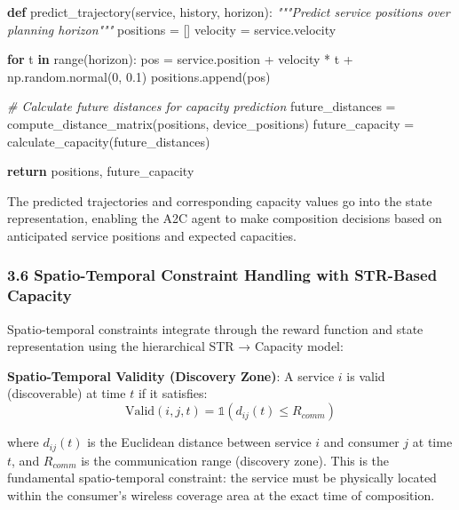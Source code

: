 \documentclass[
  10pt,
  twocolumn,
]{article}
\newenvironment{Shaded}{}{}
\newcommand{\BuiltInTok}[1]{\textcolor[rgb]{0.00,0.50,0.00}{#1}}
\newcommand{\CommentTok}[1]{\textcolor[rgb]{0.38,0.63,0.69}{\textit{#1}}}
\newcommand{\ControlFlowTok}[1]{\textcolor[rgb]{0.00,0.44,0.13}{\textbf{#1}}}
\newcommand{\DecValTok}[1]{\textcolor[rgb]{0.25,0.63,0.44}{#1}}
\newcommand{\FloatTok}[1]{\textcolor[rgb]{0.25,0.63,0.44}{#1}}
\newcommand{\KeywordTok}[1]{\textcolor[rgb]{0.00,0.44,0.13}{\textbf{#1}}}
\newcommand{\NormalTok}[1]{#1}
\newcommand{\OperatorTok}[1]{\textcolor[rgb]{0.40,0.40,0.40}{#1}}
\begin{document}
\begin{Shaded}
	\begin{Highlighting}[]
		\KeywordTok{def}\NormalTok{ predict\_trajectory(service, history, horizon):}
		\CommentTok{"""Predict service positions over planning horizon"""}
		\NormalTok{    positions }\OperatorTok{=}\NormalTok{ []}
		\NormalTok{    velocity }\OperatorTok{=}\NormalTok{ service.velocity}

		\ControlFlowTok{for}\NormalTok{ t }\KeywordTok{in} \BuiltInTok{range}\NormalTok{(horizon):}
		\NormalTok{        pos }\OperatorTok{=}\NormalTok{ service.position }\OperatorTok{+}\NormalTok{ velocity }\OperatorTok{*}\NormalTok{ t }\OperatorTok{+}\NormalTok{ np.random.normal(}\DecValTok{0}\NormalTok{, }\FloatTok{0.1}\NormalTok{)}
		\NormalTok{        positions.append(pos)}

		\CommentTok{\# Calculate future distances for capacity prediction}
		\NormalTok{    future\_distances }\OperatorTok{=}\NormalTok{ compute\_distance\_matrix(positions, device\_positions)}
		\NormalTok{    future\_capacity }\OperatorTok{=}\NormalTok{ calculate\_capacity(future\_distances)}

		\ControlFlowTok{return}\NormalTok{ positions, future\_capacity}
	\end{Highlighting}
\end{Shaded}

The predicted trajectories and corresponding capacity values go into the
state representation, enabling the A2C agent to make composition
decisions based on anticipated service positions and expected
capacities.

\hypertarget{spatio-temporal-constraint-handling-with-str-based-capacity}{%
	\subsubsection{3.6 Spatio-Temporal Constraint Handling with STR-Based
		Capacity}\label{spatio-temporal-constraint-handling-with-str-based-capacity}}

Spatio-temporal constraints integrate through the reward function and
state representation using the hierarchical STR → Capacity model:

\textbf{Spatio-Temporal Validity (Discovery Zone)}: A service \(i\) is
valid (discoverable) at time \(t\) if it satisfies:
\[\text{Valid}(i, j, t) = \mathbb{1}(d_{ij}(t) \leq R_{comm})\]

where \(d_{ij}(t)\) is the Euclidean distance between service \(i\) and
consumer \(j\) at time \(t\), and \(R_{comm}\) is the communication
range (discovery zone). This is the fundamental spatio-temporal
constraint: the service must be physically located within the consumer's
wireless coverage area at the exact time of composition.
\end{document}
